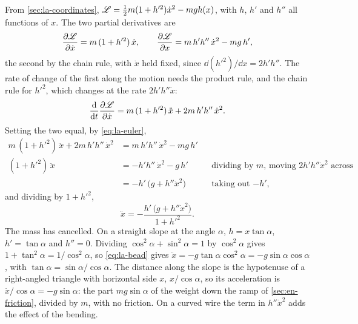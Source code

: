 From \cref{sec:la-coordinates}, $\mathscr{L} = \frac12 m(1 + h'^2)\dot{x}^2 -
mgh(x)$, with $h$, $h'$ and $h''$ all functions of $x$. The two partial
derivatives are
\begin{equation*}
   \frac{\partial\mathscr{L}}{\partial\dot{x}} = m\,(1 + h'^2)\,\dot{x} ,
   \qquad
   \frac{\partial\mathscr{L}}{\partial x} = m\,h'h''\,\dot{x}^2 - mg\,h' ,
\end{equation*}
the second by the chain rule, with $\dot{x}$ held fixed, since
$\dd(h'^2)/\dd x = 2h'h''$. The rate
of change of the first along the motion needs the product rule, and the
chain rule for $h'^2$, which changes at the rate $2h'h''\dot{x}$:
\begin{equation*}
   \frac{\mathrm{d}}{\mathrm{d} t}\frac{\partial\mathscr{L}}{\partial\dot{x}}
   = m\,(1 + h'^2)\,\ddot{x} + 2m\,h'h''\,\dot{x}^2 .
\end{equation*}
Setting the two equal, by \cref{eq:la-euler},
\begin{align*}
   m\,(1 + h'^2)\,\ddot{x} + 2m\,h'h''\,\dot{x}^2
   &= m\,h'h''\,\dot{x}^2 - mg\,h'\\
   (1 + h'^2)\,\ddot{x} &= -h'h''\,\dot{x}^2 - g\,h'
   && \text{dividing by $m$, moving $2h'h''\dot{x}^2$ across}\\
   &= -h'\,\bigl(g + h''\dot{x}^2\bigr)
   && \text{taking out $-h'$,}
\end{align*}
and dividing by $1 + h'^2$,
\begin{equation}
   \ddot{x} = -\frac{h'\,\bigl(g + h''\dot{x}^2\bigr)}{1 + h'^2} .
   \label{eq:la-bead}
\end{equation}
The mass has cancelled. On a straight slope at the angle $\alpha$, $h =
x\tan\alpha$, $h' = \tan\alpha$ and $h'' = 0$. Dividing $\cos^2\alpha +
\sin^2\alpha = 1$ by $\cos^2\alpha$ gives $1 + \tan^2\alpha =
1/\cos^2\alpha$, so \cref{eq:la-bead} gives $\ddot{x} = -g\tan\alpha
\cos^2\alpha = -g\sin\alpha\cos\alpha$, with $\tan\alpha = \sin\alpha/
\cos\alpha$. The distance along the slope is the hypotenuse of a
right-angled triangle with horizontal side $x$, $x/\cos\alpha$, so its
acceleration is $\ddot{x}/\cos\alpha = -g\sin\alpha$: the part
$mg\sin\alpha$ of the weight down the ramp of \cref{sec:en-friction},
divided by $m$, with no friction. On a curved wire
the term in $h''\dot{x}^2$ adds the effect of the bending.

